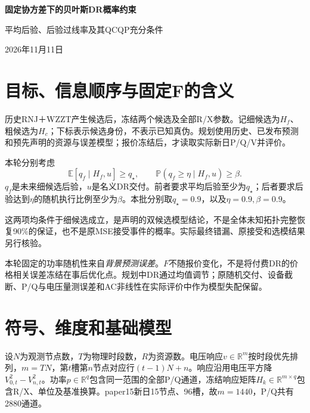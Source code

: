 \documentclass[UTF8,11pt,a4paper,fontset=fandol]{ctexart}
\newcommand{\E}{\mathbb E}
\newcommand{\Prob}{\mathbb P}
\newcommand{\R}{\mathbb R}
\numberwithin{equation}{section}
\begin{document}
\begin{center}
{\LARGE\bfseries 固定协方差下的贝叶斯DR概率约束}\par\vspace{5pt}
{\large 平均后验、后验过线率及其QCQP充分条件}\par\vspace{5pt}
2026年11月11日
\end{center}
\begin{abstract}
本文使用固定的双候选Gaussian工作模型，将DR设计中的平均对数证据增强为平均后验概率或后验过线率的充分保证。预测功率的随机载荷不随报价变化，电压剩余误差协方差也固定；完整节点、时段相关性保留。通过一次Gaussian指数积分，两个概率要求转化为同一个二次函数超过不同常数。连续资源域下是非凸QCQP，保留原设备控制图后是MIQCP。全文逐步说明符号、后验、指数上界、积分、二次系数和实际评价边界，不增加未知尺度或额外先验层。
\end{abstract}
\tableofcontents
\newpage

\section{目标、信息顺序与固定F的含义}
\label{sec:task}
历史RNJ＋WZZT产生候选后，冻结两个候选及全部R/X参数。记细候选为$H_f$、粗候选为$H_c$；下标表示候选身份，不表示已知真伪。规划使用历史、已发布预测和预先声明的资源与误差模型；报价冻结后，才读取实际新日P/Q/V并评价。

本轮分别考虑
\begin{equation}
\boxed{\E[q_f\mid H_f,u]\ge q_\star,}
\qquad
\boxed{\Prob(q_f\ge\eta\mid H_f,u)\ge\beta.}
\label{eq:targets}
\end{equation}
$q_f$是未来细候选后验，$u$是名义DR交付。前者要求平均后验至少为$q_\star$；后者要求后验达到$\eta$的随机执行比例至少为$\beta$。本批分别取$q_\star=0.9$，以及$\eta=0.9,\beta=0.9$。

这两项均条件于细候选成立，是声明的双候选模型结论，不是全体未知拓扑完整恢复90\%的保证，也不是原MSE接受事件的概率。实际最终错漏、原接受和选模结果另行核验。

本轮固定的功率随机性来自\emph{背景预测误差}。$F$不随报价变化，不是将付费DR的价格相关误差冻结在事后优化点。规划中DR通过均值调节；原随机交付、设备截断、P/Q与电压量测误差和AC非线性在实际评价中作为模型失配保留。

\section{符号、维度和基础模型}
\label{sec:model}
设$N$为观测节点数，$T$为物理时段数，$R$为资源数。电压响应$v\in\R^m$按时段优先排列，$m=TN$，第$t$槽第$n$节点对应行$(t-1)N+n$。响应沿用电压平方降$V_{0,t}^2-V_{n,t}^2$。功率$p\in\R^q$包含同一范围的全部P/Q通道，冻结响应矩阵$H_k\in\R^{m\times q}$包含R/X、单位及基准换算。paper15新日15节点、96槽，故$m=1440$，P/Q共有2880通道。
\end{document}
